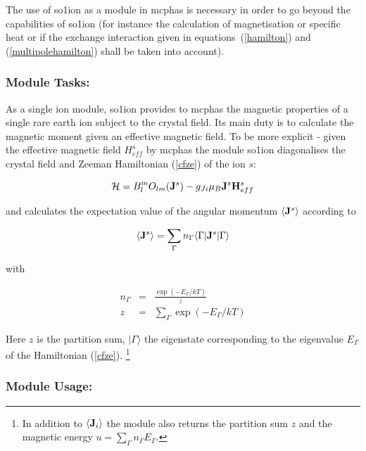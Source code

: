 The use 
 of {\prg so1ion} as a module in {\prg mcphas} is necessary in order to 
 go beyond the capabilities of {\prg so1ion} (for instance the calculation
 of magnetisation or specific heat or if the exchange interaction
 given in equations~(\ref{hamilton}) and (\ref{multipolehamilton})
  shall be taken into account).  

\subsubsection{Module Tasks:}


As a single ion module, {\prg so1ion} provides to {\prg mcphas} the magnetic properties
of a single rare earth ion subject to the crystal field. Its main duty is
to calculate the magnetic moment given an effective magnetic field. 
To be more explicit - given the effective magnetic field $H^s_{eff}$ by {\prg mcphas}
 the module {\prg so1ion}
 diagonalises the crystal field and Zeeman Hamiltonian (\ref{cfze}) of the
 ion $s$:

\begin{equation}\label{cfze}
 {\mathcal H}=  B_l^m O_{lm}({\mathbf J}^s) 
	     -  g_{Ji} \mu_B {\mathbf J}^s {\mathbf H^s_{eff}} 
\end{equation}

and calculates the expectation value of the angular momentum $\langle \mathbf J^s \rangle$
according to

\begin{equation}
\langle \mathbf J^s \rangle =
\sum_{\Gamma} n_{\Gamma} \langle \Gamma | \mathbf J^s | \Gamma \rangle
\end{equation}

with 

\begin{eqnarray}
n_{\Gamma}&=&\frac{\exp(-E_{\Gamma}/kT)}{z}\\
z&=&\sum_{\Gamma} \exp(-E_{\Gamma}/kT)
\end{eqnarray}

Here $z$ is the partition sum, $|\Gamma\rangle$ the eigenstate corresponding to
the eigenvalue $E_{\Gamma}$ of the Hamiltonian (\ref{cfze}). 
\footnote{In addition to $\langle \mathbf J_i \rangle$ the module also returns
the partition sum $z$ and the magnetic energy $u=\sum_{\Gamma} n_{\Gamma} E_{\Gamma}$.}

\subsubsection{Module Usage:}
 

